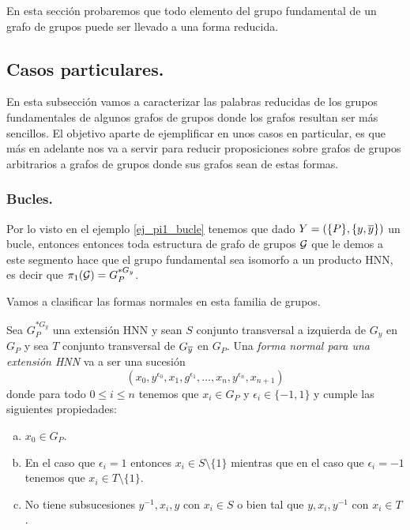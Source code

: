 \documentclass[tesis.tex]{subfiles}
\begin{document}
En esta sección probaremos que todo elemento del grupo fundamental de un grafo de grupos puede ser llevado a una forma reducida.

\subsection{Casos particulares.}

En esta subsección vamos a caracterizar las palabras reducidas de los grupos fundamentales de algunos grafos de grupos donde los grafos resultan ser más sencillos.
El objetivo aparte de ejemplificar en unos casos en particular, es que más en adelante nos va a servir para reducir proposiciones sobre grafos de grupos arbitrarios a grafos de grupos donde sus grafos sean de estas formas.

\subsubsection{Bucles.}\label{subsub_bucle}
Por lo visto en el ejemplo \ref{ej_pi1_bucle} tenemos que dado $Y = (\{P\}, \{y,\overline y\})$ un bucle, entonces entonces toda estructura de grafo de grupos ${\cal G}$ que le demos a este segmento 
hace que el grupo fundamental sea isomorfo a un producto HNN, es decir que $\pi_1({\cal G}) = G_P^{\ast G_y}$. 


Vamos a clasificar las formas normales en esta familia de grupos.

\begin{deff}\label{deff_hnn_fn}
	Sea $G_P^{\ast G_y}$ una extensión HNN  y sean $S$ conjunto transversal a izquierda de $G_y$ en $G_P$ y sea $T$ conjunto transversal de $G_{\overline y}$ en $G_P$.
	Una \emph{forma normal para una extensión HNN} va a ser una sucesión 
	\[
	(x_{0},y^{\epsilon_0},x_{1},g^{\epsilon_1}, \dots, x_{n},y^{\epsilon_n},x_{n+1})
	\]
	donde para todo $0 \le i \le n$ tenemos que $x_{i} \in G_{P}$ y $\epsilon_{i} \in \{ -1,1 \}$ y cumple las siguientes propiedades:
	\begin{enumerate}[a)]
		\item $x_0 \in G_P$.
		\item En el caso que $\epsilon_{i} = 1$ entonces $x_i \in S \setminus \{ 1\}$ mientras que en el caso que $\epsilon_{i} = -1$ tenemos que $x_{i} \in T \setminus \{ 1 \}$.
		\item No tiene subsucesiones $y^{-1},x_i,y$ con $x_i \in S$ o bien tal que $y,x_i,y^{-1}$ con $x_i \in T$.
	\end{enumerate}
\end{deff}
\end{document}

